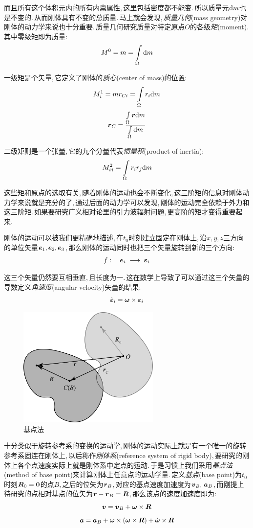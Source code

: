 而且所有这个体积元内的所有内禀属性,\,这里包括密度都不能变.\,所以质量元$\textrm{d} m$也是不变的.\,从而刚体具有不变的总质量.\,马上就会发现,\,\emph{质量几何}(mass geometry)对刚体的动力学来说也十分重要.\,质量几何研究质量对特定原点$O$的各级\emph{矩}(moment).\,其中零级矩即为质量:
\[M^0=m=\int\limits_\Omega \textrm{d} m\]

一级矩是个矢量,\,它定义了刚体的\emph{质心}(center of mass)的位置:
\[M^1_i=mr_{Ci}=\int\limits_\Omega r_i\textrm{d} m\]
\[\boldsymbol{r}_C=\frac{\int\limits_\Omega \boldsymbol{r}\textrm{d} m}{\int\limits_\Omega \textrm{d} m}\]

二级矩则是一个张量,\,它的九个分量代表\emph{惯量积}(product of inertia):
\[M^2_{ij}=\int\limits_\Omega r_ir_j\textrm{d} m\]

这些矩和原点的选取有关,\,随着刚体的运动也会不断变化,\,这三阶矩的信息对刚体动力学来说就是充分的了,\,通过后面的动力学可以发现,\,刚体的运动完全依赖于外力和这三阶矩.\,如果要研究广义相对论里的引力波辐射问题,\,更高阶的矩才变得重要起来.

刚体的运动可以被我们更精确地描述,\,在$t_0$时刻建立固定在刚体上,\,沿$x,y,z$三方向的单位矢量$\boldsymbol{e}_1,\boldsymbol{e}_2,\boldsymbol{e}_3$,\,那么刚体的运动同时也把三个矢量旋转到新的三个方向:
\[f:\quad \boldsymbol{e}_i\;\longrightarrow\; \boldsymbol{\varepsilon}_i\]

这三个矢量仍然要互相垂直,\,且长度为一.\,这在数学上导致了可以通过这三个矢量的导数定义\emph{角速度}(angular velocity)矢量的结果:
\[\dot{\boldsymbol{\varepsilon}}_i=\boldsymbol{\omega}\times\boldsymbol{\varepsilon}_i\]

\begin{figure}
\vspace{-0.7cm}
\centering
\includegraphics[width=7cm]{image/6-6-2.png}
\caption{基点法}
\end{figure}
十分类似于旋转参考系的变换的运动学,\,刚体的运动实际上就是有一个唯一的旋转参考系固连在刚体上,\,以后称作\emph{刚体系}(reference system of rigid body),\,要研究的刚体上各个点速度实际上就是刚体系中定点的运动.\,于是习惯上我们采用\emph{基点法}(method of base point)来计算刚体上任意点的运动学量.\,定义\emph{基点}(base point)为$t_0$时刻$\boldsymbol{R}_0=\boldsymbol{0}$的点$B$,\,之后的位矢为$\boldsymbol{r}_B$,\,对应的基点速度加速度为$\boldsymbol{v}_B,\,\boldsymbol{a}_B$,\,而刚提上待研究的点相对基点的位矢为$\boldsymbol{r}-\boldsymbol{r}_B=\boldsymbol{R}$,\,那么该点的速度加速度即为:
\[\boldsymbol{v}=\boldsymbol{v}_B+\boldsymbol{\omega}\times\boldsymbol{R}\]
\[\boldsymbol{a}=\boldsymbol{a}_B+\boldsymbol{\omega}\times(\boldsymbol{\omega}\times\boldsymbol{R})+\dot{\boldsymbol{\omega}}\times\boldsymbol{R}\]

